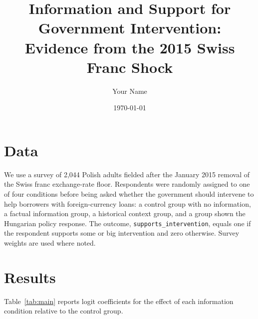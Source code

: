 \documentclass[12pt]{article}
\title{Information and Support for Government Intervention:\\
Evidence from the 2015 Swiss Franc Shock}
\author{Your Name}
\date{\today}
\begin{document}
\maketitle

\section{Data}

We use a survey of 2{,}044 Polish adults fielded after the January 2015 removal of the Swiss franc exchange-rate floor. Respondents were randomly assigned to one of four conditions before being asked whether the government should intervene to help borrowers with foreign-currency loans: a control group with no information, a factual information group, a historical context group, and a group shown the Hungarian policy response. The outcome, \texttt{supports\_intervention}, equals one if the respondent supports some or big intervention and zero otherwise. Survey weights are used where noted.

\section{Results}


Table~\ref{tab:main} reports logit coefficients for the effect of each information condition relative to the control group.

\begin{table}[htbp]
  \centering
  \caption{Effect of Information Conditions on Support for Intervention}
  \label{tab:main}
  
\end{table}
\end{document}
